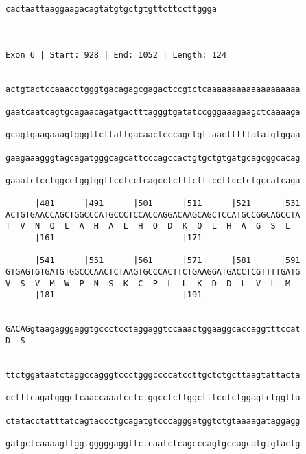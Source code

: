 \documentclass{article}
\begin{document}
\begin{Verbatim}
cactaattaaggaagacagtatgtgctgtgttcttccttggga
                                           
                                           
 
Exon 6 | Start: 928 | End: 1052 | Length: 124


actgtactccaaacctgggtgacagagcgagactccgtctcaaaaaaaaaaaaaaaaaaa
                                                            
gaatcaatcagtgcagaacagatgactttagggtgatatccgggaaagaagctcaaaaga
                                                            
gcagtgaagaaagtgggttcttattgacaactcccagctgttaactttttatatgtggaa
                                                            
gaagaaagggtagcagatgggcagcattcccagccactgtgctgtgatgcagcggcacag
                                                            
gaaatctcctggcctggtggttcctcctcagcctctttctttccttcctctgccatcaga
                                                            
      |481      |491      |501      |511      |521      |531
ACTGTGAACCAGCTGGCCCATGCCCTCCACCAGGACAAGCAGCTCCATGCCGGCAGCCTA
T  V  N  Q  L  A  H  A  L  H  Q  D  K  Q  L  H  A  G  S  L  
      |161                          |171                    
  
      |541      |551      |561      |571      |581      |591
GTGAGTGTGATGTGGCCCAACTCTAAGTGCCCACTTCTGAAGGATGACCTCGTTTTGATG
V  S  V  M  W  P  N  S  K  C  P  L  L  K  D  D  L  V  L  M  
      |181                          |191                    
  
                                                            
GACAGgtaagagggaggtgccctcctaggaggtccaaactggaaggcaccaggtttccat
D  S                                                        
                                                            
  
ttctggataatctaggccagggtccctgggccccatccttgctctgcttaagtattacta
                                                            
cctttcagatgggctcaaccaaatcctctggcctcttggctttcctctggagtctggtta
                                                            
ctatacctatttatcagtaccctgcagatgtcccagggatggtctgtaaaagataggagg
                                                            
gatgctcaaaagttggtgggggaggttctcaatctcagcccagtgccagcatgtgtactg
                                                            

\end{Verbatim}
\end{document}
